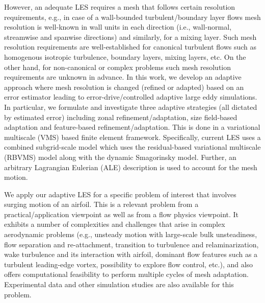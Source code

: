 However, an adequate LES requires a mesh that follows certain resolution requirements, e.g., in case of a wall-bounded turbulent/boundary layer flows mesh resolution is well-known in wall units in each direction (i.e., wall-normal, streamwise and spanwise directions) and similarly, for a mixing layer.
Such mesh resolution requirements are well-established for canonical turbulent flows such as homogenous isotropic turbulence, boundary layers, mixing layers, etc. 
On the other hand, for non-canonical or complex problems such mesh resolution requirements are unknown in advance. 
In this work, we develop an adaptive approach where mesh resolution is changed (refined or adapted) based on an error estimator leading to error-drive/controlled adaptive large eddy simulations.
In particular, we formulate and investigate three adaptive strategies
(all dictated by estimated error) including zonal refinement/adaptation, size field-based adaptation and
feature-based refinement/adaptation. 
This is done in a variational multiscale (VMS) based finite element
framework. 
Specifically, current LES uses a combined subgrid-scale model which uses the residual-based
variational multiscale (RBVMS) model along with the dynamic Smagorinsky model.
Further, an arbitrary Lagrangian Eulerian (ALE) description is used to account for the mesh motion.

We apply our adaptive LES for a specific problem of interest that involves surging motion of an airfoil. 
This is a relevant problem from a practical/application viewpoint as well as from a flow physics viewpoint.
It exhibits a number of complexities and challenges that arise in complex aerodynamic
problems (e.g., unsteady motion with large-scale bulk unsteadiness, flow separation and re-attachment, transition to turbulence and relaminarization, wake turbulence and its interaction with airfoil, dominant flow features such as a turbulent leading-edge vortex, possibility to explore flow control, etc.), and also
offers computational feasibility to perform multiple cycles of mesh adaptation. Experimental data and other simulation studies are also available for this problem.